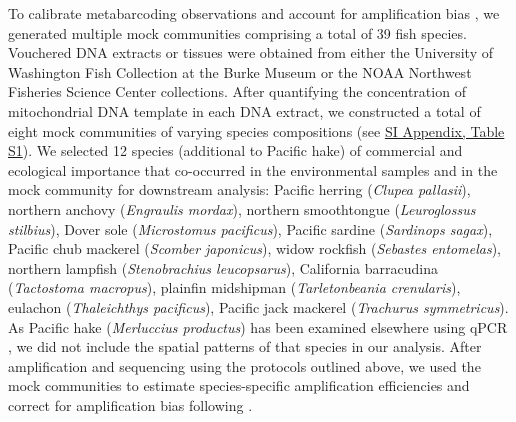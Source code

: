 \documentclass{article}
\begin{document}
To calibrate metabarcoding observations and account for amplification bias \cite{shelton2023,gold2023}, we generated multiple mock communities comprising a total of 39 fish species. Vouchered DNA extracts or tissues were obtained from either the University of Washington Fish Collection at the Burke Museum or the NOAA Northwest Fisheries Science Center collections. After quantifying the concentration of mitochondrial DNA template in each DNA extract, we constructed a total of eight mock communities of varying species compositions (see \href{SI_Appendix.pdf}{SI Appendix, Table S1}). We selected 12 species (additional to Pacific hake) of commercial and ecological importance that co-occurred in the environmental samples and in the mock community for downstream analysis: Pacific herring (\textit{Clupea pallasii}), northern anchovy (\textit{Engraulis mordax}), northern smoothtongue (\textit{Leuroglossus stilbius}), Dover sole (\textit{Microstomus pacificus}), Pacific sardine (\textit{Sardinops sagax}), Pacific chub mackerel (\textit{Scomber japonicus}), widow rockfish (\textit{Sebastes entomelas}), northern lampfish (\textit{Stenobrachius leucopsarus}), California barracudina (\textit{Tactostoma macropus}), plainfin midshipman (\textit{Tarletonbeania crenularis}), eulachon (\textit{Thaleichthys pacificus}), Pacific jack mackerel (\textit{Trachurus symmetricus}). As Pacific hake (\textit{Merluccius productus}) has been examined elsewhere using qPCR \cite{shelton2022}, we did not include the spatial patterns of that species in our analysis. After amplification and sequencing using the protocols outlined above, we used the mock communities to estimate species-specific amplification efficiencies and correct for amplification bias following \cite{shelton2023}.
\end{document}

